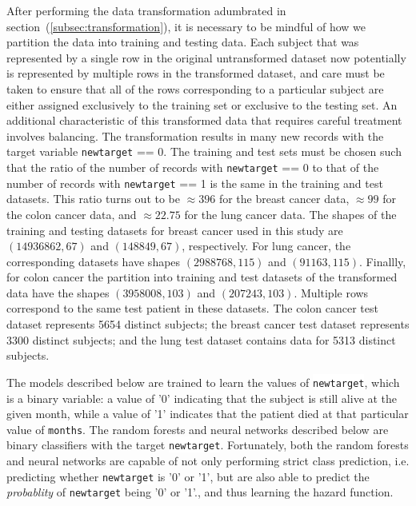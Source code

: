 \documentclass[a4paper,11pt]{article}
\newcommand{\codewhite}[1]{\colorbox{white}{\texttt{#1}}}
\begin{document}
After performing the data transformation adumbrated in section~(\ref{subsec:transformation}), it is necessary to be mindful of how we partition the data into training and testing data. Each subject that was represented by a single row in the original untransformed dataset now potentially is represented by multiple rows in the transformed dataset, and care must be taken to ensure that all of the rows corresponding to a particular subject are either assigned exclusively to the training set or exclusive to the testing set. 
An additional characteristic of this transformed data that requires careful treatment involves balancing. The transformation results in many new records with the target variable \codewhite{newtarget} == 0. The training and test sets must be chosen such that the ratio of the number of records with \codewhite{newtarget} == 0 to that of the number of records with \codewhite{newtarget} == 1 is the same in the training and test datasets.
This ratio turns out to be $\approx 396$ for the breast cancer data, $\approx  99$ for the colon cancer data, and 
$\approx 22.75$ for the lung cancer data. 
The shapes of the training and testing datasets for breast cancer used in this study are $(14936862, 67)$ and 
$(148849, 67)$, respectively.
For lung cancer, the corresponding datasets have shapes $(2988768, 115)$ and $(91163, 115)$.
Finallly, for colon cancer the partition into training and test datasets of the transformed data have the shapes 
$(3958008, 103)$ and $(207243, 103)$. Multiple rows correspond to the same test patient in these datasets.
The colon cancer test dataset represents 5654 distinct subjects; the breast cancer test dataset represents 3300 distinct subjects; and the lung test dataset contains data for 5313 distinct subjects.


 
The models described below are trained to learn the values of \codewhite{newtarget}, which is a binary variable: a value of '0' indicating that the subject is still alive at the given month, while a value of '1' indicates that the patient died at that particular value of \codewhite{months}. The random forests and neural networks described below are binary classifiers with the target \codewhite{newtarget}. Fortunately, both the random forests and neural networks are capable of not only performing strict class prediction, i.e. predicting whether \codewhite{newtarget} is '0' or '1', but are also able to predict the \textit{probablity} of \codewhite{newtarget} being '0' or '1'., and thus learning the hazard function.
\end{document}
